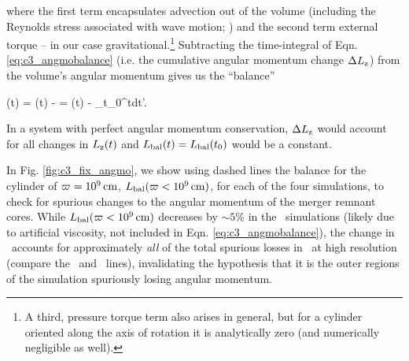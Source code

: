 

\noindent where the first term encapsulates advection out of the volume (including the Reynolds stress associated with wave motion; \citealt{balb03, kratl16}) and the second term external torque -- in our case gravitational.\footnote{A third, pressure torque term also arises in general, but for a cylinder oriented along the axis of rotation it is analytically zero (and numerically negligible as well).}  Subtracting the time-integral of Eqn. \ref{eq:c3_angmobalance} (i.e. the cumulative angular momentum change $\Delta \Lz$) from the volume's angular momentum gives us the ``balance''

\eqbegin
\Lbal(t) = \Lz(t) - \Delta \Lz = \Lz(t) - \int_{t_0}^{t}dt'.
\label{eq:c3_angmobalance2}
\eqend

\noindent In a system with perfect angular momentum conservation, $\Delta \Lz$ would account for all changes in $\Lz(t)$ and $\Lbal(t) = \Lbal(t_0)$ would be a constant.  

In Fig. \ref{fig:c3_fix_angmo}, we show using dashed lines the balance for the cylinder of $\varpi = 10^9\,\mathrm{cm}$, $\Lbal(\winnercyl)$, for each of the four simulations, to check for spurious changes to the angular momentum of the merger remnant cores.  While $\Lbal(\winnercyl)$ decreases by $\sim5$\% in the \gasoline\ simulations (likely due to artificial viscosity, not included in Eqn. \ref{eq:c3_angmobalance}), the change in \Lbal\ accounts for approximately \textit{all} of the total spurious losses in \arepo\ at high resolution (compare the \Lztot\ and \Lbal\ lines), invalidating the hypothesis that it is the outer regions of the simulation spuriously losing angular momentum.  

